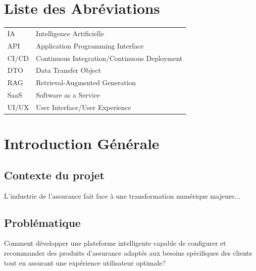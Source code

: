\documentclass[12pt,a4paper]{report}
\begin{document}
\listoffigures

\listoftables

\chapter*{Liste des Abréviations}

\begin{tabular}{ll}
    IA & Intelligence Artificielle \\
    API & Application Programming Interface \\
    CI/CD & Continuous Integration/Continuous Deployment \\
    DTO & Data Transfer Object \\
    RAG & Retrieval-Augmented Generation \\
    SaaS & Software as a Service \\
    UI/UX & User Interface/User Experience \\
    \end{tabular}

\chapter{Introduction Générale}
\label{chap:introduction}

\section{Contexte du projet}
L'industrie de l'assurance fait face à une transformation numérique majeure...

\section{Problématique}
Comment développer une plateforme intelligente capable de configurer et recommander des produits d'assurance adaptés aux besoins spécifiques des clients tout en assurant une expérience utilisateur optimale?
\end{document}
